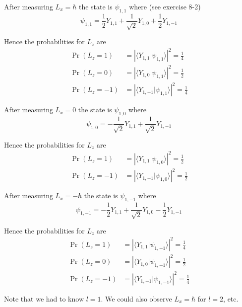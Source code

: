 


After measuring $L_x=\hbar$ the state is $\psi_{1,1}$ where (see exercise 8-2)
\begin{equation*}
\psi_{1,1}=\frac{1}{2}Y_{1,1}+\frac{1}{\sqrt2}Y_{1,0}+\frac{1}{2}Y_{1,-1}
\end{equation*}

Hence the probabilities for $L_z$ are
\begin{align*}
\Pr(L_z=1)&=\left|\langle Y_{1,1}|\psi_{1,1}\rangle\right|^2=\tfrac{1}{4}
\\[1ex]
\Pr(L_z=0)&=\left|\langle Y_{1,0}|\psi_{1,1}\rangle\right|^2=\tfrac{1}{2}
\\[1ex]
\Pr(L_z=-1)&=\left|\langle Y_{1,-1}|\psi_{1,1}\rangle\right|^2=\tfrac{1}{4}
\end{align*}

After measuring $L_x=0$ the state is $\psi_{1,0}$ where
\begin{equation*}
\psi_{1,0}=-\frac{1}{\sqrt2}Y_{1,1}+\frac{1}{\sqrt2}Y_{1,-1}
\end{equation*}

Hence the probabilities for $L_z$ are
\begin{align*}
\Pr(L_z=1)&=\left|\langle Y_{1,1}|\psi_{1,0}\rangle\right|^2=\tfrac{1}{2}
\\[1ex]
\Pr(L_z=-1)&=\left|\langle Y_{1,-1}|\psi_{1,0}\rangle\right|^2=\tfrac{1}{2}
\end{align*}

After measuring $L_x=-\hbar$ the state is $\psi_{1,-1}$ where
\begin{equation*}
\psi_{1,-1}=-\frac{1}{2}Y_{1,1}+\frac{1}{\sqrt2}Y_{1,0}-\frac{1}{2}Y_{1,-1}
\end{equation*}

Hence the probabilities for $L_z$ are
\begin{align*}
\Pr(L_z=1)&=\left|\langle Y_{1,1}|\psi_{1,-1}\rangle\right|^2=\tfrac{1}{4}
\\[1ex]
\Pr(L_z=0)&=\left|\langle Y_{1,0}|\psi_{1,-1}\rangle\right|^2=\tfrac{1}{2}
\\[1ex]
\Pr(L_z=-1)&=\left|\langle Y_{1,-1}|\psi_{1,-1}\rangle\right|^2=\tfrac{1}{4}
\end{align*}

Note that we had to know $l=1$.
We could also observe $L_x=\hbar$ for $l=2$, etc.


